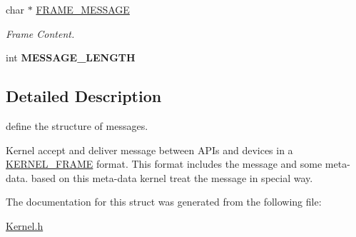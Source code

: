 \begin{DoxyCompactItemize}
\mbox{\label{struct_k_e_r_n_e_l___f_r_a_m_e_adb33c1f45314f3a78597d889550e066c}} 
char $\ast$ \hyperlink{struct_k_e_r_n_e_l___f_r_a_m_e_adb33c1f45314f3a78597d889550e066c}{F\+R\+A\+M\+E\+\_\+\+M\+E\+S\+S\+A\+GE}
\begin{DoxyCompactList}\small\item\em Frame Content. \end{DoxyCompactList}\item 
\mbox{\label{struct_k_e_r_n_e_l___f_r_a_m_e_ace41ffd02032f82d32bac76fa0d3c828}} 
int {\bfseries M\+E\+S\+S\+A\+G\+E\+\_\+\+L\+E\+N\+G\+TH}
\end{DoxyCompactItemize}


\subsection{Detailed Description}
define the structure of messages. 

Kernel accept and deliver message between A\+P\+Is and devices in a \hyperlink{struct_k_e_r_n_e_l___f_r_a_m_e}{K\+E\+R\+N\+E\+L\+\_\+\+F\+R\+A\+ME} format. This format includes the message and some meta-\/data. based on this meta-\/data kernel treat the message in special way. 

The documentation for this struct was generated from the following file\+:\begin{DoxyCompactItemize}
\item 
\hyperlink{_kernel_8h}{Kernel.\+h}\end{DoxyCompactItemize}
